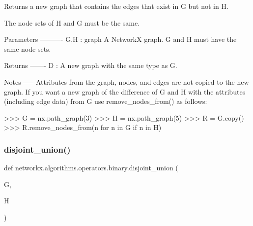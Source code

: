 \begin{DoxyVerb}Returns a new graph that contains the edges that exist in G but not in H.

The node sets of H and G must be the same.

Parameters
----------
G,H : graph
   A NetworkX graph.  G and H must have the same node sets.

Returns
-------
D : A new graph with the same type as G.

Notes
-----
Attributes from the graph, nodes, and edges are not copied to the new
graph.  If you want a new graph of the difference of G and H with
the attributes (including edge data) from G use remove_nodes_from()
as follows:

>>> G = nx.path_graph(3)
>>> H = nx.path_graph(5)
>>> R = G.copy()
>>> R.remove_nodes_from(n for n in G if n in H)
\end{DoxyVerb}
 \mbox{\label{namespacenetworkx_1_1algorithms_1_1operators_1_1binary_a24a3e1feb5877673d0f4398390ee0827}} 
\subsubsection{\texorpdfstring{disjoint\+\_\+union()}{disjoint\_union()}}
{\footnotesize\ttfamily def networkx.\+algorithms.\+operators.\+binary.\+disjoint\+\_\+union (\begin{DoxyParamCaption}\item[{}]{G,  }\item[{}]{H }\end{DoxyParamCaption})}

